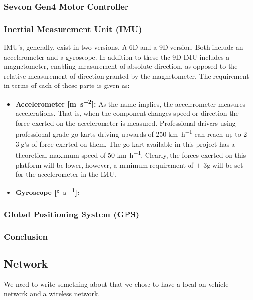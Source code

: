 \subsubsection*{Sevcon Gen4 Motor Controller}

\subsubsection*{Inertial Measurement Unit (IMU)}
IMU's, generally, exist in two versions.
A 6D and a 9D version.
Both include an accelerometer and a gyroscope.
In addition to these the 9D IMU includes a magnetometer, enabling measurement of absolute direction, as opposed to the relative measurement of direction granted by the magnetometer.
The requirement in terms of each of these parts is given as:
\begin{itemize}
	\item \textbf{Accelerometer [\si{\metre\per\second^2}]:} As the name implies, the accelerometer measures accelerations.
	That is, when the component changes speed or direction the force exerted on the accelerometer is measured.
	Professional drivers using professional grade go karts driving upwards of 250 \si{\kilo\metre\per\hour} can reach up to 2-3 g's of force exerted on them.
	The go kart available in this project has a theoretical maximum speed of 50 \si{\kilo\metre\per\hour}.
	Clearly, the forces exerted on this platform will be lower, however, a minimum requirement of $\pm$ 3g will be set for the accelerometer in the IMU.
	\item \textbf{Gyroscope [\si{\degree\per\second}]:} 
\end{itemize}

\subsubsection*{Global Positioning System (GPS)}


\subsubsection*{Conclusion}




\subsection{Network}
We need to write something about that we chose to have a local on-vehicle network and a wireless network.







